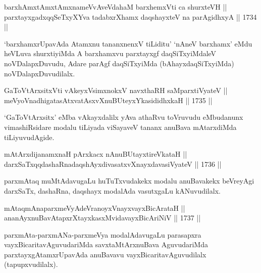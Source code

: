 
\begin{shl}
barxhAmxtAmx\s \s tAmxnameVvAveVdahaM barxhemxVti ca shurxteVH || \\
parxtayxgadxqqSeTxyXYva tadabxrXhamx daqshayxteV na parAgidhxyA ||  1734 ||  
\end{shl}

\begin{artha}
`barxhamxrUpavAda Atamxnu tananxnenxV tiLiditu' `nAneV barxhamx' eMdu
heVLuva shurxtiyiMda A barxhamxvu parxtayxgf daqSiTxyiMdaleV
noVDalapxDuvudu, Adare parAgf daqSiTxyiMda (bAhayxdaqSiTxyiMda)
noVDalapxDuvudilalx.
\end{artha}


\begin{shl}
GaToV\s tArxsitxVti vAkeyxV\s simxnokxV navxthaRH saMparxtiVyateV ||  \\
meVyoV\s nadhigatasAtxvatAsxvXnuBUteyxYkasididhxkaH ||  1735 ||  
\end{shl}

\begin{artha}
`GaToV\s tArxsitx' eMba vAkayxdalilx yAva athaRvu toVruvudu eMbudanunx
vimashiRsidare modalu tiLiyada viSayaveV tananx anuBava mAtarxdiMda
tiLiyuvudAgide.
\end{artha}

\begin{shl}
mAtArxdijanamxnaH pArxkacx nAnuBUtayxtireVkataH || \\
darxSaTxqqdashaRnadaqshAyxdivasatxvXnayxdavasiVyateV ||  1736 || 
\end{shl}

\begin{artha}
parxmAtaq muMtAdavugaLu huTuTxvudakekx modalu anuBavakekx beVreyAgi
darxSaTx, dashaRna, daqshayx modalAda vasutxgaLu kANuvudilalx.
\end{artha}

\begin{shl}
mAtaqmAnaparxmeVyAdeVranoyxVnayxvayxBicArataH ||  \\
ananAyxnuBavAtapxrXtayxkasxMvidavayxBicAriNiV ||  1737 ||  
\end{shl}

\begin{artha}
parxmAta-parxmANa-parxmeVya modalAdavugaLu parasapxra
vayxBicaritavAguvudariMda savxtaMtArxnuBava AguvudariMda
parxtayxgAtamxrUpavAda anuBavavu vayxBicaritavAguvudilalx
(tapupxvudilalx).
\end{artha}

